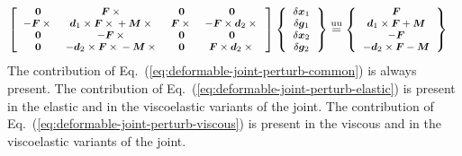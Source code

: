\documentclass[10pt,dvips,fleqn,subeqn]{report}
\newcommand{\T}[1]{\bm{#1}}
\newcommand{\equu}{\overset{\text{uu}}{=}}
\begin{document}
\begin{align}
	\footnotesize
	\sqbr{\matr{cccc}{
		\T{0} & \T{F}\times{} & \T{0} & \T{0} \\
		- \T{F}\times{} & \T{d}_1\times\T{F}\times{} + \T{M}\times{} & \T{F}\times{} & - \T{F}\times\T{d}_2\times{} \\
		\T{0} & - \T{F}\times{} & \T{0} & \T{0} \\
		\T{0} & - \T{d}_2\times\T{F}\times{} - \T{M}\times{} & \T{0} & \T{F}\times\T{d}_2\times{}
	}} \cubr{\cvvect{
		\delta\T{x}_1 \\
		\delta\T{g}_1 \\
		\delta\T{x}_2 \\
		\delta\T{g}_2
	}}
%
%
%
	\equu \cubr{\cvvect{
		\T{F} \\
		\T{d}_1 \times \T{F} + \T{M} \\
		- \T{F} \\
		- \T{d}_2 \times \T{F} - \T{M}
	}} &
	\label{eq:deformable-joint-perturb-common}
\end{align}
The contribution of Eq.~(\ref{eq:deformable-joint-perturb-common})
is always present.
The contribution of Eq.~(\ref{eq:deformable-joint-perturb-elastic})
is present in the elastic and in the viscoelastic variants of the joint.
The contribution of Eq.~(\ref{eq:deformable-joint-perturb-viscous})
is present in the viscous and in the viscoelastic variants of the joint.
\end{document}

